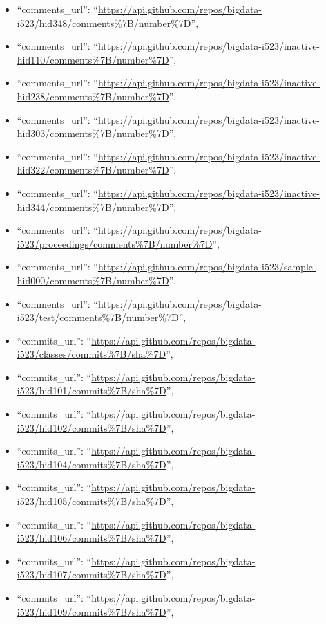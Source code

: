 \begin{itemize}
\item
  ``comments\_url'':
  ``\url{https://api.github.com/repos/bigdata-i523/hid348/comments\%7B/number\%7D}'',
\item
  ``comments\_url'':
  ``\url{https://api.github.com/repos/bigdata-i523/inactive-hid110/comments\%7B/number\%7D}'',
\item
  ``comments\_url'':
  ``\url{https://api.github.com/repos/bigdata-i523/inactive-hid238/comments\%7B/number\%7D}'',
\item
  ``comments\_url'':
  ``\url{https://api.github.com/repos/bigdata-i523/inactive-hid303/comments\%7B/number\%7D}'',
\item
  ``comments\_url'':
  ``\url{https://api.github.com/repos/bigdata-i523/inactive-hid322/comments\%7B/number\%7D}'',
\item
  ``comments\_url'':
  ``\url{https://api.github.com/repos/bigdata-i523/inactive-hid344/comments\%7B/number\%7D}'',
\item
  ``comments\_url'':
  ``\url{https://api.github.com/repos/bigdata-i523/proceedings/comments\%7B/number\%7D}'',
\item
  ``comments\_url'':
  ``\url{https://api.github.com/repos/bigdata-i523/sample-hid000/comments\%7B/number\%7D}'',
\item
  ``comments\_url'':
  ``\url{https://api.github.com/repos/bigdata-i523/test/comments\%7B/number\%7D}'',
\item
  ``commits\_url'':
  ``\url{https://api.github.com/repos/bigdata-i523/classes/commits\%7B/sha\%7D}'',
\item
  ``commits\_url'':
  ``\url{https://api.github.com/repos/bigdata-i523/hid101/commits\%7B/sha\%7D}'',
\item
  ``commits\_url'':
  ``\url{https://api.github.com/repos/bigdata-i523/hid102/commits\%7B/sha\%7D}'',
\item
  ``commits\_url'':
  ``\url{https://api.github.com/repos/bigdata-i523/hid104/commits\%7B/sha\%7D}'',
\item
  ``commits\_url'':
  ``\url{https://api.github.com/repos/bigdata-i523/hid105/commits\%7B/sha\%7D}'',
\item
  ``commits\_url'':
  ``\url{https://api.github.com/repos/bigdata-i523/hid106/commits\%7B/sha\%7D}'',
\item
  ``commits\_url'':
  ``\url{https://api.github.com/repos/bigdata-i523/hid107/commits\%7B/sha\%7D}'',
\item
  ``commits\_url'':
  ``\url{https://api.github.com/repos/bigdata-i523/hid109/commits\%7B/sha\%7D}'',

\end{itemize}
